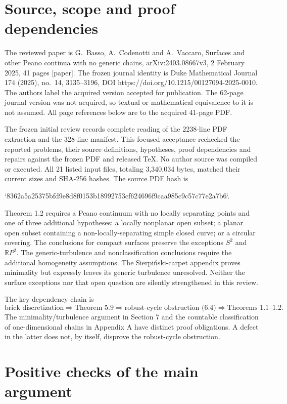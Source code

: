 \documentclass[10pt]{article}
\begin{document}
\section*{Source, scope and proof dependencies}
The reviewed paper is G. Basso, A. Codenotti and A. Vaccaro, Surfaces and other Peano continua with no generic chains, arXiv:2403.08667v3, 2 February 2025, 41 pages [paper]. The frozen journal identity is Duke Mathematical Journal 174 (2025), no. 14, 3135–3196, DOI https://doi.org/10.1215/00127094-2025-0010. The authors label the acquired version accepted for publication. The 62-page journal version was not acquired, so textual or mathematical equivalence to it is not assumed. All page references below are to the acquired 41-page PDF.\par
The frozen initial review records complete reading of the 2238-line PDF extraction and the 328-line manifest. This focused acceptance rechecked the reported problems, their source definitions, hypotheses, proof dependencies and repairs against the frozen PDF and released TeX. No author source was compiled or executed. All 21 listed input files, totaling 3,340,034 bytes, matched their current sizes and SHA-256 hashes. The source PDF hash is\par
`8362a5a25375bfd9e8d8f0153b18992753cf624696f9caa985c9c57c77e2a7b6`.\par
Theorem 1.2 requires a Peano continuum with no locally separating points and one of three additional hypotheses: a locally nonplanar open subset; a planar open subset containing a non-locally-separating simple closed curve; or a circular covering. The conclusions for compact surfaces preserve the exceptions \(S^2\) and \(\mathbb RP^2\). The generic-turbulence and nonclassification conclusions require the additional homogeneity assumptions. The Sierpiński-carpet appendix proves minimality but expressly leaves its generic turbulence unresolved. Neither the surface exceptions nor that open question are silently strengthened in this review.\par
The key dependency chain is \[\text{brick discretization}
 \Longrightarrow\text{Theorem 5.9}
 \Longrightarrow\text{robust-cycle obstruction (6.4)}
 \Longrightarrow\text{Theorems 1.1--1.2}.\] The minimality/turbulence argument in Section 7 and the countable classification of one-dimensional chains in Appendix A have distinct proof obligations. A defect in the latter does not, by itself, disprove the robust-cycle obstruction.\par
\section*{Positive checks of the main argument}
\end{document}
